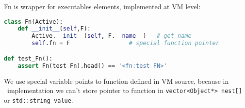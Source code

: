 \clearpage{}\label{VMcommand}

Fn is wrapper for executables elements, implemented at VM level:
\begin{lstlisting}[language=Python]
class Fn(Active):
	def __init__(self,F):
		Active.__init__(self, F.__name__)   # get name
		self.fn = F					# special function pointer

def test_Fn():
	assert Fn(test_Fn).head() == '<fn:test_FN>'
\end{lstlisting}

\noindent
We use special variable points to function defined in VM source, because in
\cpp\ implementation we can't store pointer to function in
\verb|vector<Object*> nest[]| or \verb|std::string value|.
